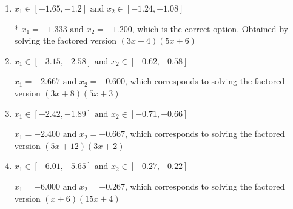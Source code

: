 \documentclass{extbook}[14pt]
\begin{document}
\begin{enumerate}
{\begin{enumerate}[label=\Alph*.]
$x_1 = -20.000 \text{ and } x_2 = -18.000$, which corresponds to solving the factored version $(x + 20)(x + 18)$
\item \( x_1 \in [-1.65, -1.2] \text{ and } x_2 \in [-1.24, -1.08] \)

* $x_1 = -1.333 \text{ and } x_2 = -1.200$, which is the correct option. Obtained by solving the factored version $(3x + 4)(5x + 6)$
\item \( x_1 \in [-3.15, -2.58] \text{ and } x_2 \in [-0.62, -0.58] \)

$x_1 = -2.667 \text{ and } x_2 = -0.600$, which corresponds to solving the factored version $(3x + 8)(5x + 3)$
\item \( x_1 \in [-2.42, -1.89] \text{ and } x_2 \in [-0.71, -0.66] \)

$x_1 = -2.400 \text{ and } x_2 = -0.667$, which corresponds to solving the factored version $(5x + 12)(3x + 2)$
\item \( x_1 \in [-6.01, -5.65] \text{ and } x_2 \in [-0.27, -0.22] \)

$x_1 = -6.000 \text{ and } x_2 = -0.267$, which corresponds to solving the factored version $(x + 6)(15x + 4)$
\end{enumerate}

}
\end{enumerate}
\end{document}
